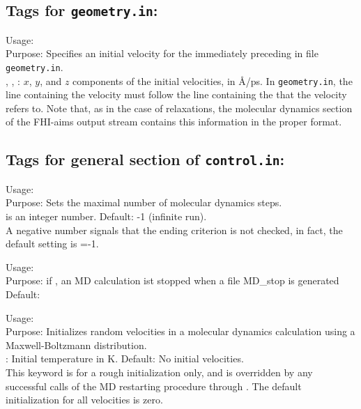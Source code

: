 
\subsection*{Tags for \texttt{geometry.in}:}

{	\noindent
  Usage:     \\[1.0ex]
  Purpose: Specifies an initial velocity for the immediately preceding
     in file \texttt{geometry.in}. \\[1.0ex]
  , ,  : $x$, $y$, and $z$ components
    of the initial velocities, in \AA/ps. 
}
In \texttt{geometry.in}, the line containing the velocity must follow
the line containing the  that the velocity refers
to. Note that, as in the case of relaxations, the molecular dynamics
section of the FHI-aims output stream contains this information in the
proper format.

\newpage

\subsection*{Tags for general section of \texttt{control.in}:}

{\noindent
	Usage:   \\[1.0ex]
	Purpose: Sets the maximal number of molecular dynamics
          steps. \\[1.0ex]
         is an integer number. Default: -1 (infinite
          run). \\ 
}
A negative number signals that the ending criterion is not checked, in
fact, the default setting is =-1. 

{\noindent
      Usage:  \\[1.0ex]
      Purpose: if , an MD calculation ist stopped when a file MD\_stop is generated \\[1.0ex]
      Default:  \\}

{\noindent
	Usage:   \\[1.0ex]
	Purpose: Initializes random velocities in a molecular dynamics calculation 
          using a Maxwell-Boltzmann distribution. \\[1.0ex]
         : Initial temperature in K. Default: No
          initial velocities. \\
}
This keyword is for a rough initialization only, and is overridden by
any successful calls of the MD restarting procedure through
. The default initialization for all velocities
is zero. 

